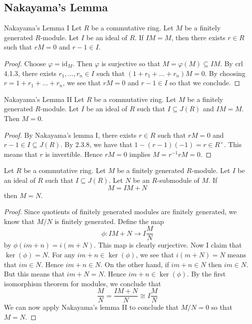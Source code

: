 \documentclass[a4paper]{article}
\begin{document}
\subsection{Nakayama's Lemma}
\begin{lmm}{Nakayama's Lemma I}{} Let $R$ be a commutative ring. Let $M$ be a finitely generated $R$-module. Let $I$ be an ideal of $R$. If $IM=M$, then there exists $r\in R$ such that $rM=0$ and $r-1\in I$. \tcbline
\begin{proof}
Choose $\varphi=\text{id}_M$. Then $\varphi$ is surjective so that $M=\varphi(M)\subseteq IM$. By crl 4.1.3, there exists $r_1,\dots,r_n\in I$ such that $(1+r_1+\dots+r_n)M=0$. By choosing $r=1+r_1+\dots+r_n$, we see that $rM=0$ and $r-1\in I$ so that we conclude. 
\end{proof}
\end{lmm}

\begin{lmm}{Nakayama's Lemma II}{} Let $R$ be a commutative ring. Let $M$ be a finitely generated $R$-module. Let $I$ be an ideal of $R$ such that $I\subseteq J(R)$ and $IM=M$. Then $M=0$. \tcbline
\begin{proof}
By Nakayama's lemma I, there exists $r\in R$ such that $rM=0$ and $r-1\in I\subseteq J(R)$. By 2.3.8, we have that $1-(r-1)(-1)=r\in R^\times$. This means that $r$ is invertible. Hence $rM=0$ implies $M=r^{-1}rM=0$. 
\end{proof}
\end{lmm}

\begin{crl}{}{} Let $R$ be a commutative ring. Let $M$ be a finitely generated $R$-module. Let $I$ be an ideal of $R$ such that $I\subseteq J(R)$. Let $N$ be an $R$-submodule of $M$. If $$M=IM+N$$ then $M=N$. \tcbline
\begin{proof}
Since quotients of finitely generated modules are finitely generated, we know that $M/N$ is finitely generated. Define the map $$\phi:IM+N\to I\frac{M}{N}$$ by $\phi(im+n)=i(m+N)$. This map is clearly surjective. Now I claim that $\ker(\phi)=N$. For any $im+n\in\ker(\phi)$, we see that $i(m+N)=N$ means that $im\in N$. Hence $im+n\in N$. On the other hand, if $im+n\in N$ then $im\in N$. But this means that $im+N=N$. Hence $im+n\in\ker(\phi)$. By the first isomorphism theorem for modules, we conclude that $$\frac{M}{N}=\frac{IM+N}{N}\cong I\frac{M}{N}$$ We can now apply Nakayama's lemma II to conclude that $M/N=0$ so that $M=N$. 
\end{proof}
\end{crl}
\end{document}
